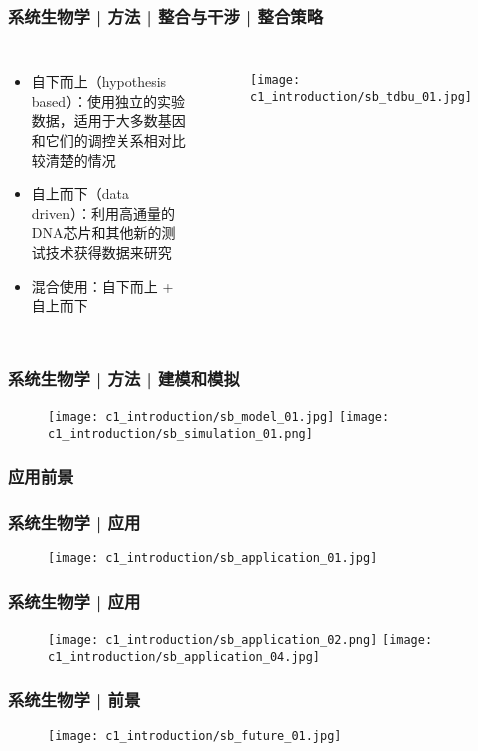 \begin{frame}
  \frametitle{系统生物学 | 方法 | 整合与干涉 | 整合策略}
  \begin{columns}
    \begin{itemize}
    \item 自下而上（hypothesis based）：使用独立的实验数据，适用于大多数基因和它们的调控关系相对比较清楚的情况
    \item 自上而下（data driven）：利用高通量的DNA芯片和其他新的测试技术获得数据来研究
    \item 混合使用：自下而上 + 自上而下
  \end{itemize}
  \begin{figure}
    \centering
    \texttt{[image: c1\_introduction/sb\_tdbu\_01.jpg]}
  \end{figure}
  \end{columns}
\end{frame}

\begin{frame}
  \frametitle{系统生物学 | 方法 | 建模和模拟}
  \begin{figure}
    \centering
    \texttt{[image: c1\_introduction/sb\_model\_01.jpg]}
    \texttt{[image: c1\_introduction/sb\_simulation\_01.png]}
  \end{figure}
\end{frame}

\subsubsection{应用前景}
\begin{frame}
  \frametitle{系统生物学 | 应用}
  \begin{figure}
    \centering
    \texttt{[image: c1\_introduction/sb\_application\_01.jpg]}
  \end{figure}
\end{frame}

\begin{frame}
  \frametitle{系统生物学 | 应用}
  \begin{figure}
    \centering
    \texttt{[image: c1\_introduction/sb\_application\_02.png]}
    \texttt{[image: c1\_introduction/sb\_application\_04.jpg]}
  \end{figure}
\end{frame}

\begin{frame}
  \frametitle{系统生物学 | 前景}
  \begin{figure}
    \centering
    \texttt{[image: c1\_introduction/sb\_future\_01.jpg]}
  \end{figure}
\end{frame}
